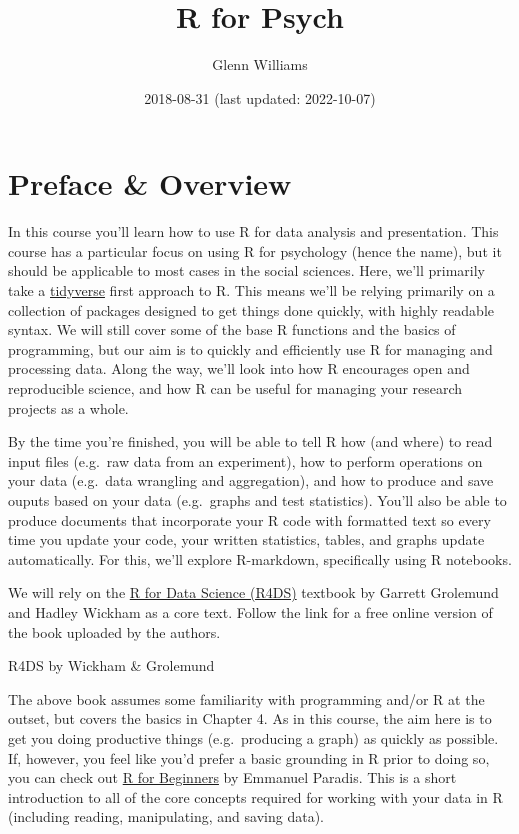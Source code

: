 \documentclass[
]{book}
\title{R for Psych}
\author{Glenn Williams}
\date{2018-08-31 (last updated: 2022-10-07)}
\begin{document}
\maketitle

{
\setcounter{tocdepth}{1}
\tableofcontents
}
\hypertarget{preface-overview}{%
\chapter*{Preface \& Overview}\label{preface-overview}}

In this course you'll learn how to use R for data analysis and presentation. This course has a particular focus on using R for psychology (hence the name), but it should be applicable to most cases in the social sciences. Here, we'll primarily take a \href{https://www.tidyverse.org/}{tidyverse} first approach to R. This means we'll be relying primarily on a collection of packages designed to get things done quickly, with highly readable syntax. We will still cover some of the base R functions and the basics of programming, but our aim is to quickly and efficiently use R for managing and processing data. Along the way, we'll look into how R encourages open and reproducible science, and how R can be useful for managing your research projects as a whole.

By the time you're finished, you will be able to tell R how (and where) to read input files (e.g.~raw data from an experiment), how to perform operations on your data (e.g.~data wrangling and aggregation), and how to produce and save ouputs based on your data (e.g.~graphs and test statistics). You'll also be able to produce documents that incorporate your R code with formatted text so every time you update your code, your written statistics, tables, and graphs update automatically. For this, we'll explore R-markdown, specifically using R notebooks.

We will rely on the \href{http://r4ds.had.co.nz/}{R for Data Science (R4DS)} textbook by Garrett Grolemund and Hadley Wickham as a core text. Follow the link for a free online version of the book uploaded by the authors.

R4DS by Wickham \& Grolemund

The above book assumes some familiarity with programming and/or R at the outset, but covers the basics in Chapter 4. As in this course, the aim here is to get you doing productive things (e.g.~producing a graph) as quickly as possible. If, however, you feel like you'd prefer a basic grounding in R prior to doing so, you can check out \href{https://cran.r-project.org/doc/contrib/Paradis-rdebuts_en.pdf}{R for Beginners} by Emmanuel Paradis. This is a short introduction to all of the core concepts required for working with your data in R (including reading, manipulating, and saving data).
\end{document}
